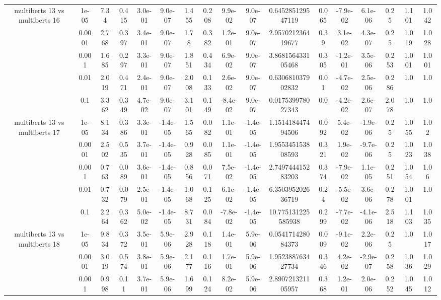 \begin{tabular}{|c|c|c|c|c|c|c|c|c|c|c|c|c|c|c|c|c|}
\hline
\multirow{5}{*}{multiberts 13 vs multiberts 16} & 1e-05 & 7.34 & 0.415 & 3.0e-01 & 9.0e-07 & 1.455 & 0.208 & 9.9e-02 & 9.0e-07 & 0.645285129547119 & 0.065 & -7.9e-02 & 6.1e-06 & 0.25 & 1.101 & 1.042 \\
 & 0.0001 & 2.768 & 0.397 & 3.4e-01 & 9.0e-07 & 1.78 & 0.382 & 1.2e-01 & 9.0e-07 & 2.957021236419677 & 0.39 & 3.1e-02 & 4.3e-07 & 0.25 & 1.019 & 1.028 \\
 & 0.001 & 1.685 & 0.297 & 3.3e-01 & 9.0e-07 & 1.851 & 0.434 & 6.9e-02 & 9.0e-07 & 3.868156433105468 & 0.305 & -1.2e-01 & 3.5e-06 & 0.253 & 1.001 & 1.001 \\
 & 0.01 & 2.019 & 0.471 & 2.4e-01 & 9.0e-07 & 2.008 & 0.133 & 2.6e-02 & 9.0e-07 & 0.630681037902832 & 0.01 & -4.7e-02 & 2.5e-06 & 0.286 & 1.0 & 1.0 \\
 & 0.1 & 3.362 & 0.349 & 4.7e-02 & 9.0e-07 & 3.101 & 0.149 & -8.4e-02 & 9.0e-07 & 0.017539978027343 & 0.0 & -4.2e-02 & 2.6e-07 & 2.078 & 1.0 & 1.0 \\
\hline
\multirow{5}{*}{multiberts 13 vs multiberts 17} & 1e-05 & 8.134 & 0.386 & 3.3e-01 & -1.4e-05 & 1.565 & 0.082 & 1.1e-01 & -1.4e-05 & 1.151418447494506 & 0.092 & 5.4e-02 & -1.9e-06 & 0.25 & 1.055 & 1.02 \\
 & 0.0001 & 2.502 & 0.535 & 3.7e-01 & -1.4e-05 & 0.928 & 0.085 & 1.1e-01 & -1.4e-05 & 1.955345153808593 & 0.321 & 1.9e-02 & -9.7e-06 & 0.25 & 1.023 & 1.038 \\
 & 0.001 & 0.763 & 0.089 & 3.6e-01 & -1.4e-05 & 0.856 & 0.071 & 7.5e-02 & -1.4e-05 & 2.749744415283203 & 0.374 & -7.9e-02 & 1.1e-05 & 0.251 & 1.054 & 1.06 \\
 & 0.01 & 0.732 & 0.079 & 2.5e-01 & -1.4e-05 & 1.068 & 0.125 & 6.1e-02 & -1.4e-05 & 6.350395202636719 & 0.24 & -5.5e-02 & 3.6e-06 & 0.278 & 1.001 & 1.0 \\
 & 0.1 & 2.264 & 0.362 & 5.0e-02 & -1.4e-05 & 8.731 & 0.084 & -7.8e-02 & -1.4e-05 & 10.775131225585938 & 0.299 & -7.7e-02 & -4.1e-06 & 2.518 & 1.103 & 1.035 \\
\hline
\multirow{5}{*}{multiberts 13 vs multiberts 18} & 1e-05 & 9.834 & 0.372 & 3.5e-01 & 5.9e-06 & 2.928 & 0.118 & 1.4e-01 & 5.9e-06 & 0.054171428084373 & 0.009 & -9.1e-02 & 2.2e-06 & 0.25 & 1.0 & 1.017 \\
 & 0.0001 & 3.019 & 0.574 & 3.8e-01 & 5.9e-06 & 2.177 & 0.116 & 1.7e-01 & 5.9e-06 & 1.952388763427734 & 0.346 & 4.2e-02 & -2.9e-07 & 0.258 & 1.036 & 1.029 \\
 & 0.001 & 0.998 & 0.11 & 3.7e-01 & 5.9e-06 & 1.699 & 0.124 & 8.2e-02 & 5.9e-06 & 2.890721321105957 & 0.368 & 1.2e-01 & 2.0e-06 & 0.252 & 1.045 & 1.012 \\

\end{tabular}
